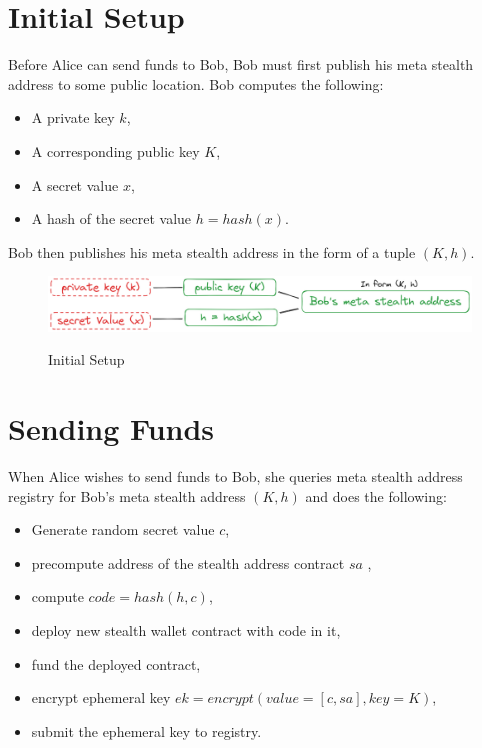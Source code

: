 \pagebreak
\section{Initial Setup}

Before Alice can send funds to Bob, Bob must first publish his meta stealth
address to some public location. Bob computes the following:

\begin{itemize}
	\item A private key $k$,
	\item A corresponding public key $K$,
	\item A secret value $x$,
	\item A hash of the secret value $h = hash(x)$.
\end{itemize}

Bob then publishes his meta stealth address in the form of a tuple $(K, h)$.

\begin{figure}[h]
    \centering
    \includegraphics[scale=0.30]{assets/images/initial-setup.png}
    \caption{Initial Setup}
    \label{fig:initial-setup}
	\cite{ButerinIncompleteGuide}
    \vspace{0.5cm}
\end{figure}

\section{Sending Funds}

When Alice wishes to send funds to Bob, she queries meta stealth address registry
for Bob's meta stealth address $(K, h)$ and does the following:

\begin{itemize}
	\item Generate random secret value $c$,
    \item precompute address of the stealth address contract $sa$ \cite{stackexchangeAddressEthereum},
	\item compute $code = hash(h, c)$,
    \item deploy new stealth wallet contract with code in it,
    \item fund the deployed contract,
	\item encrypt ephemeral key $ek = encrypt(value=[c, sa], key=K)$,
    \item submit the ephemeral key to registry.
\end{itemize}

